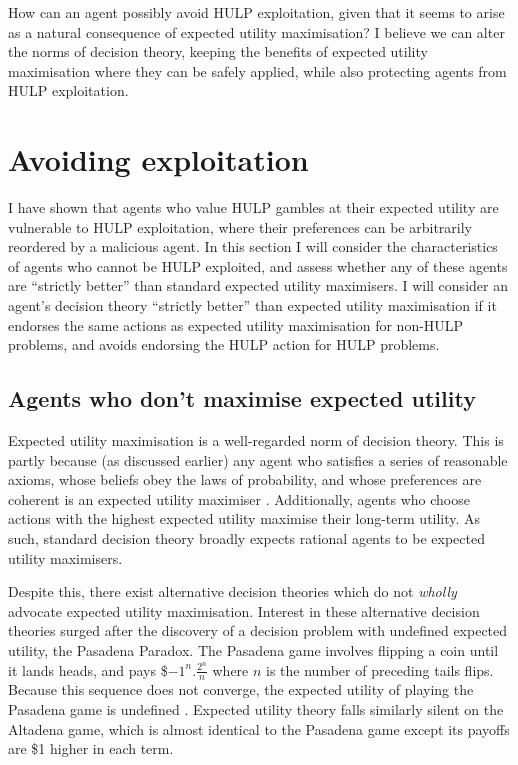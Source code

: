 \documentclass{article}
\begin{document}
How can an agent possibly avoid HULP exploitation, given that it seems to arise as a natural consequence of expected utility maximisation? I believe we can alter the norms of decision theory, keeping the benefits of expected utility maximisation where they can be safely applied, while also protecting agents from HULP exploitation.

\newpage\section{Avoiding exploitation}

I have shown that agents who value HULP gambles at their expected utility are vulnerable to HULP exploitation, where their preferences can be arbitrarily reordered by a malicious agent. In this section I will consider the characteristics of agents who cannot be HULP exploited, and assess whether any of these agents are ``strictly better'' than standard expected utility maximisers. I will consider an agent's decision theory ``strictly better'' than expected utility maximisation if it endorses the same actions as expected utility maximisation for non-HULP problems, and avoids endorsing the HULP action for HULP problems.

\subsection{Agents who don't maximise expected utility}

Expected utility maximisation is a well-regarded norm of decision theory. This is partly because (as discussed earlier) any agent who satisfies a series of reasonable axioms, whose beliefs obey the laws of probability, and whose preferences are coherent is an expected utility maximiser \citep{von1944games}. Additionally, agents who choose actions with the highest expected utility maximise their long-term utility. As such, standard decision theory broadly expects rational agents to be expected utility maximisers.

Despite this, there exist alternative decision theories which do not \textit{wholly} advocate expected utility maximisation. Interest in these alternative decision theories surged after the discovery of a decision problem with undefined expected utility, the Pasadena Paradox. The Pasadena game involves flipping a coin until it lands heads, and pays \$\(-1^n.\frac{2^n}{n}\) where \(n\) is the number of preceding tails flips. Because this sequence does not converge, the expected utility of playing the Pasadena game is undefined \citep{nover2004vexing}. Expected utility theory falls similarly silent on the Altadena game, which is almost identical to the Pasadena game except its payoffs are \$1 higher in each term.
\end{document}

